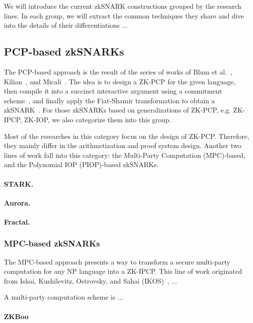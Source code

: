 \documentclass[acmtog]{acmart}
\begin{document}
We will introduce the current zkSNARK constructions grouped by the research lines.
In each group, we will extract the common techniques they share and dive into the details of their differentiations ...

\subsection{PCP-based zkSNARKs}

The PCP-based approach is the result of the series of works of Blum et al.~\cite{BabaiFLS91}, Kilian~\cite{Kilian92}, and Micali~\cite{Micali00}.
The idea is to design a ZK-PCP for the given language, then compile it into a succinct interactive argument using a commitment scheme~\cite{Kilian92}, and finally apply the Fiat-Shamir transformation to obtain a zkSNARK~\cite{Micali00}.
For those zkSNARKs based on generalizations of ZK-PCP, e.g. ZK-IPCP, ZK-IOP, we also categorize them into this group.

Most of the researches in this category focus on the design of ZK-PCP.
Therefore, they mainly differ in the arithmetization and proof system design.
Another two lines of work fall into this category: the Multi-Party Computation (MPC)-based, and the Polynomial IOP (PIOP)-based zkSNARKs.

\paragraph{STARK.}

\paragraph{Aurora.}

\paragraph{Fractal.}

\subsubsection{MPC-based zkSNARKs}

The MPC-based approach presents a way to transform a secure multi-party computation for any NP language into a ZK-IPCP.
This line of work originated from Ishai, Kushilevitz, Ostrovsky, and Sahai (IKOS)~\cite{IshaiKOS07}, ...

A multi-party computation scheme is ...

\paragraph{ZKBoo}
\end{document}

